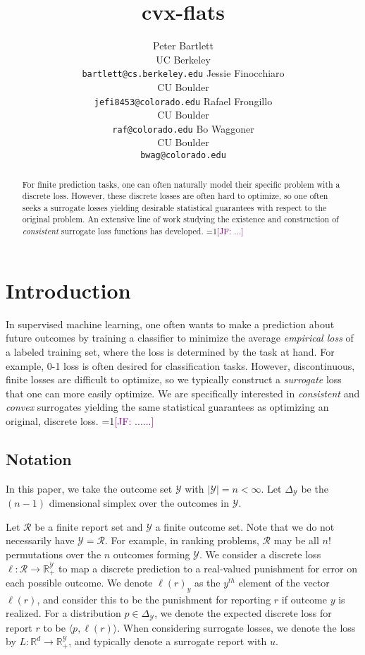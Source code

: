 \documentclass{article}
\title{cvx-flats}
\author{%
	Peter Bartlett\\
	UC Berkeley\\
	\texttt{bartlett@cs.berkeley.edu}
	\And
  Jessie Finocchiaro\\
  CU Boulder\\
  \texttt{jefi8453@colorado.edu} 
  \And
   Rafael Frongillo\\
   CU Boulder\\
   \texttt{raf@colorado.edu} 
   \And
   Bo Waggoner\\
   CU Boulder \\
   \texttt{bwag@colorado.edu} 
}
\newcommand{\Comments}{1}
\newcommand{\mynote}[2]{\ifnum\Comments=1\textcolor{#1}{#2}\fi}
\newcommand{\jessie}[1]{\mynote{purple}{[JF: #1]}}
\newcommand{\reals}{\mathbb{R}}
\newcommand{\simplex}{\Delta_\Y}
\newcommand{\R}{\mathcal{R}}
\newcommand{\Y}{\mathcal{Y}}
\newcommand{\inprod}[2]{\langle #1, #2 \rangle}
\begin{document}
\maketitle

\begin{abstract}
	For finite prediction tasks, one can often naturally model their specific problem with a discrete loss.
	However, these discrete losses are often hard to optimize, so one often seeks a surrogate losses yielding desirable statistical guarantees with respect to the original problem.
	An extensive line of work studying the existence and construction of \emph{consistent} surrogate loss functions has developed.
	\jessie{...}
\end{abstract}

\section{Introduction}\label{sec:intro}

In supervised machine learning, one often wants to make a prediction about future outcomes by training a classifier to minimize the average \emph{empirical loss} of a labeled training set, where the loss is determined by the task at hand.
For example, 0-1 loss is often desired for classification tasks.
However, discontinuous, finite losses are difficult to optimize, so we typically construct a \emph{surrogate} loss that one can more easily optimize.
We are specifically interested in \emph{consistent} and \emph{convex} surrogates yielding the same statistical guarantees as optimizing an original, discrete loss.
\jessie{......}

\subsection{Notation}
In this paper, we take the outcome set $\Y$ with $|\Y| = n < \infty$.
Let $\simplex$ be the $(n-1)$ dimensional simplex over the outcomes in $\Y$.

Let $\R$ be a finite report set and $\Y$ a finite outcome set.
Note that we do not necessarily have $\Y = \R$.  
For example, in ranking problems, $\R$ may be all $n!$ permutations over the $n$ outcomes forming $\Y$.
We consider a discrete loss $\ell : \R \to \reals_+^\Y$ to map a discrete prediction to a real-valued punishment for error on each possible outcome.
We denote $\ell(r)_y$ as the $y^{th}$ element of the vector $\ell(r)$, and consider this to be the punishment for reporting $r$ if outcome $y$ is realized.
For a distribution $p \in \simplex$, we denote the expected discrete loss for report $r$ to be $\inprod{p}{\ell(r)}$.
When considering surrogate losses, we denote the loss by $L : \reals^d \to \reals_+^\Y$, and typically denote a surrogate report with $u$.
\end{document}
